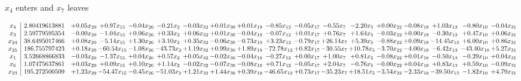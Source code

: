 \documentclass[9pt]{article}
\begin{document}
 $ x_{4} $ enters and $ x_{7} $ leaves 

 \[\begin{array}{c| c c@{\hskip 2pt} c@{\hskip 2pt} c@{\hskip 2pt} c@{\hskip 2pt} c@{\hskip 2pt} c@{\hskip 2pt} c@{\hskip 2pt} c@{\hskip 2pt} c@{\hskip 2pt} c@{\hskip 2pt} c@{\hskip 2pt} c@{\hskip 2pt} c@{\hskip 2pt} c@{\hskip 2pt} c@{\hskip 2pt} c@{\hskip 2pt} }
 x_{4}   &  2.80419613881 & +  0.05 x_{29} & +  0.97 x_{15} & -0.04 x_{26} & -0.21 x_{2} & -0.03 x_{32} & +  0.01 x_{30} & +  0.01 x_{19} & -0.85 x_{12} & -0.05 x_{17} & -0.55 x_{7} & -2.20 x_{5} & +  0.00 x_{22} & -0.08 x_{18} & +  1.03 x_{13} & -0.80 x_{10} & -0.04 x_{31}\\
 x_{3}   &  2.59779595354 & -0.00 x_{29} & -1.04 x_{15} & +  0.06 x_{26} & +  0.33 x_{2} & +  0.06 x_{32} & +  0.01 x_{30} & -0.04 x_{19} & -0.07 x_{12} & +  0.01 x_{17} & +  0.76 x_{7} & +  1.64 x_{5} & -0.03 x_{22} & +  0.00 x_{18} & -0.30 x_{13} & +  0.47 x_{10} & +  0.06 x_{31}\\
 x_{24}   &  38.6495017466 & +  0.08 x_{29} & -5.14 x_{15} & +  1.30 x_{26} & +  3.10 x_{2} & +  0.35 x_{32} & -0.06 x_{30} & -0.73 x_{19} & +  3.23 x_{12} & -0.79 x_{17} & + 26.14 x_{7} & +  5.39 x_{5} & -0.88 x_{22} & +  0.09 x_{18} & -14.45 x_{13} & +  6.00 x_{10} & +  0.86 x_{31}\\
 x_{25}   &  186.755797423 & +  0.18 x_{29} & -60.54 x_{15} & -1.08 x_{26} & -43.73 x_{2} & +  1.19 x_{32} & +  0.99 x_{30} & +  1.89 x_{19} & -72.78 x_{12} & +  0.82 x_{17} & -30.55 x_{7} & + 10.78 x_{5} & -3.70 x_{22} & -4.00 x_{18} & -6.42 x_{13} & -43.40 x_{10} & +  5.27 x_{31}\\
 x_{1}   &  3.52668866833 & -0.03 x_{29} & -1.37 x_{15} & +  0.04 x_{26} & +  0.57 x_{2} & +  0.05 x_{32} & -0.02 x_{30} & -0.04 x_{19} & -0.27 x_{12} & +  0.00 x_{17} & +  1.00 x_{7} & +  0.81 x_{5} & -0.08 x_{22} & +  0.01 x_{18} & -0.50 x_{13} & -0.29 x_{10} & +  0.04 x_{31}\\
 x_{6}   &  1.07475637861 & +  0.03 x_{29} & +  0.09 x_{15} & +  0.10 x_{26} & +  1.14 x_{2} & -0.02 x_{32} & -0.07 x_{30} & -0.08 x_{19} & +  0.71 x_{12} & -0.05 x_{17} & +  2.04 x_{7} & -0.76 x_{5} & -0.00 x_{22} & +  0.04 x_{18} & +  0.83 x_{13} & +  0.59 x_{10} & -0.09 x_{31}\\
 x_{23}   &  195.272500509 & +  1.23 x_{29} & -54.47 x_{15} & -0.45 x_{26} & -51.03 x_{2} & +  1.21 x_{32} & +  1.44 x_{30} & +  0.39 x_{19} & -46.65 x_{12} & +  0.73 x_{17} & -35.23 x_{7} & + 18.51 x_{5} & -3.54 x_{22} & -2.33 x_{18} & -39.50 x_{13} & -1.82 x_{10} & +  4.79 x_{31}\\

\end{array}\]
\end{document}
